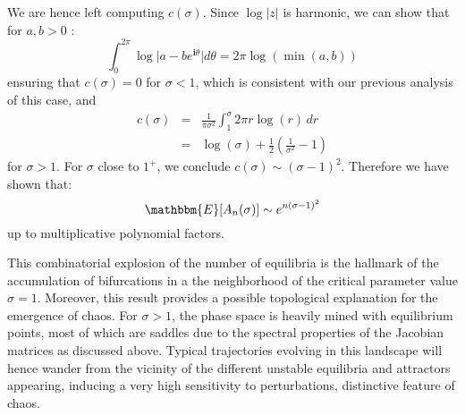 We are hence left computing $c(\sigma)$. Since $\log \vert z\vert$ is harmonic, we can show that for $a,b>0$ :
\[\int_0^{2\pi} \log\vert a - be^{\mathbf{i}\theta}\vert d\theta = 2\pi \log(\min (a, b))\]
ensuring that $c(\sigma)=0$ for $\sigma<1$, which is consistent with our previous analysis of this case, and 
\begin{eqnarray}
	\nonumber c(\sigma)&=&\frac 1 {\pi\sigma^2} \int_1^{\sigma} 2\pi r\log(r)\,dr \\
	&=& \log(\sigma) + \frac 1 2 \left(\frac 1 {\sigma^2}-1\right)\label{eq:CofSigma}
\end{eqnarray}
for $\sigma>1$. For $\sigma$ close to $1^+$, we conclude $c(\sigma)\sim (\sigma-1)^2$. 
Therefore we have shown that:
\begin{equation}\label{eq:result}
	\mathbbm{E}[A_n(\sigma)]\sim e^{n(\sigma-1)^2}
\end{equation}
up to multiplicative polynomial factors.

This combinatorial explosion of the number of equilibria is the hallmark of the accumulation of bifurcations \cite{cessac:95} in a the neighborhood of the critical parameter value $\sigma=1$. Moreover, this result provides a possible topological explanation for the emergence of chaos. For $\sigma>1$, the phase space is heavily mined with equilibrium points, most of which are saddles due to the spectral properties of the Jacobian matrices as discussed above. Typical trajectories evolving in this landscape will hence wander from the vicinity of the different unstable equilibria and attractors appearing, inducing a very high sensitivity to perturbations, distinctive feature of chaos. 

